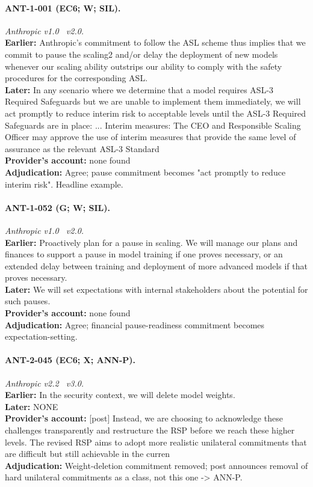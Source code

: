 \paragraph{ANT-1-001 (EC6; W; SIL).} \emph{Anthropic v1.0 \textrightarrow\ v2.0.}\\
\textbf{Earlier:} Anthropic's commitment to follow the ASL scheme thus implies that we commit to pause the scaling2 and/or delay the deployment of new models whenever our scaling ability outstrips our ability to comply with the safety procedures for the corresponding ASL.\\
\textbf{Later:} In any scenario where we determine that a model requires ASL-3 Required Safeguards but we are unable to implement them immediately, we will act promptly to reduce interim risk to acceptable levels until the ASL-3 Required Safeguards are in place: ... Interim measures: The CEO and Responsible Scaling Officer may approve the use of interim measures that provide the same level of assurance as the relevant ASL-3 Standard\\
\textbf{Provider's account:} none found\\
\textbf{Adjudication:} Agree; pause commitment becomes "act promptly to reduce interim risk". Headline example.

\paragraph{ANT-1-052 (G; W; SIL).} \emph{Anthropic v1.0 \textrightarrow\ v2.0.}\\
\textbf{Earlier:} Proactively plan for a pause in scaling. We will manage our plans and finances to support a pause in model training if one proves necessary, or an extended delay between training and deployment of more advanced models if that proves necessary.\\
\textbf{Later:} We will set expectations with internal stakeholders about the potential for such pauses.\\
\textbf{Provider's account:} none found\\
\textbf{Adjudication:} Agree; financial pause-readiness commitment becomes expectation-setting.

\paragraph{ANT-2-045 (EC6; X; ANN-P).} \emph{Anthropic v2.2 \textrightarrow\ v3.0.}\\
\textbf{Earlier:} In the security context, we will delete model weights.\\
\textbf{Later:} NONE\\
\textbf{Provider's account:} [post] Instead, we are choosing to acknowledge these challenges transparently and restructure the RSP before we reach these higher levels. The revised RSP aims to adopt more realistic unilateral commitments that are difficult but still achievable in the curren\\
\textbf{Adjudication:} Weight-deletion commitment removed; post announces removal of hard unilateral commitments as a class, not this one -> ANN-P.

